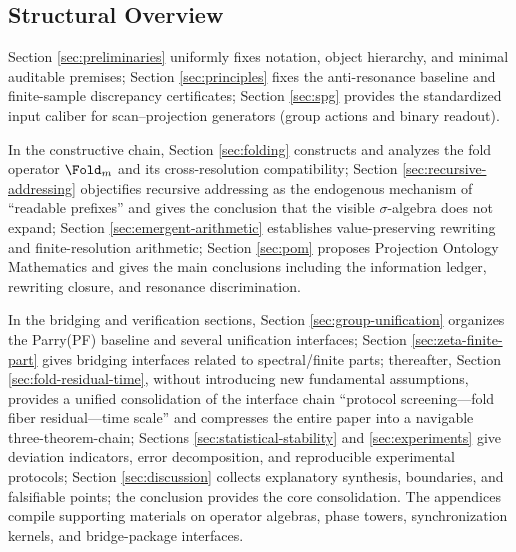 \subsection{Structural Overview}
Section \ref{sec:preliminaries} uniformly fixes notation, object hierarchy, and minimal auditable premises; Section \ref{sec:principles} fixes the anti-resonance baseline and finite-sample discrepancy certificates; Section \ref{sec:spg} provides the standardized input caliber for scan--projection generators (group actions and binary readout).\par
In the constructive chain, Section \ref{sec:folding} constructs and analyzes the fold operator \(\Fold_m\) and its cross-resolution compatibility; Section \ref{sec:recursive-addressing} objectifies recursive addressing as the endogenous mechanism of ``readable prefixes'' and gives the conclusion that the visible \(\sigma\)-algebra does not expand; Section \ref{sec:emergent-arithmetic} establishes value-preserving rewriting and finite-resolution arithmetic; Section \ref{sec:pom} proposes Projection Ontology Mathematics and gives the main conclusions including the information ledger, rewriting closure, and resonance discrimination.\par
In the bridging and verification sections, Section \ref{sec:group-unification} organizes the Parry(PF) baseline and several unification interfaces; Section \ref{sec:zeta-finite-part} gives bridging interfaces related to spectral/finite parts; thereafter, Section \ref{sec:fold-residual-time}, without introducing new fundamental assumptions, provides a unified consolidation of the interface chain ``protocol screening---fold fiber residual---time scale'' and compresses the entire paper into a navigable three-theorem-chain; Sections \ref{sec:statistical-stability} and \ref{sec:experiments} give deviation indicators, error decomposition, and reproducible experimental protocols; Section \ref{sec:discussion} collects explanatory synthesis, boundaries, and falsifiable points; the conclusion provides the core consolidation. The appendices compile supporting materials on operator algebras, phase towers, synchronization kernels, and bridge-package interfaces.
